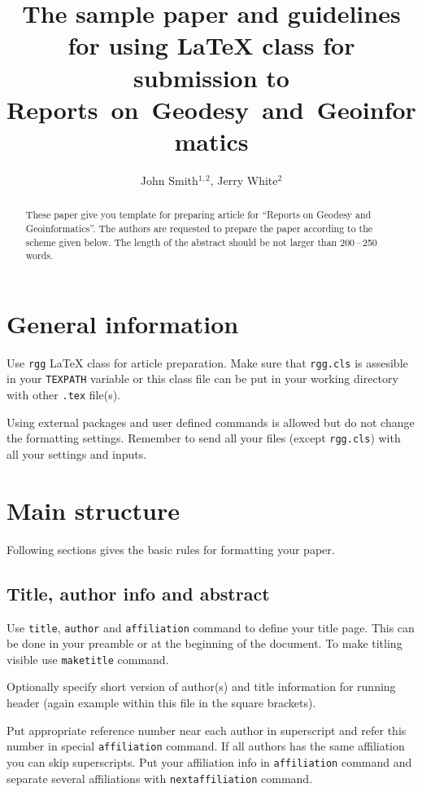\documentclass{rgg}
\title[The sample paper\ldots]{%
  The sample paper and guidelines for using \LaTeX{} class for submission to 
  Reports~on~Geodesy~and~Geoinformatics}
\author[Smith, J., White, J.]{John Smith$^{1,2}$, Jerry White$^2$}
\affiliation{%
  $^1$Department of Very Important Issues,\\
  Faculty of Even More Important Issues,\\
  Awesome University
  \nextaffiliation
  $^2$Department of Geodesy Affairs,\\
  Institute of Geodesy and Geoinformatics
}
\begin{document}
    \maketitle

    \begin{abstract}
      These paper give you template for preparing article for ``Reports on 
      Geodesy and Geoinformatics''. The authors are requested to prepare the 
      paper according to the scheme given below. The length of the abstract 
      should be not larger than 200\,–\,250 words.
    \end{abstract}

  \section{General information}
    Use \texttt{rgg} \LaTeX{} class for article preparation.
    Make sure that \texttt{rgg.cls} is assesible in your
    \texttt{TEXPATH} variable or this class file can be put
    in your working directory with other \texttt{.tex} file(s).

    Using external packages and user defined commands is allowed
    but do not change the formatting settings.
    Remember to send all your files (except \texttt{rgg.cls}) 
    with all your settings and inputs.

  \section{Main structure}
    \label{labelforsection}

    Following sections gives the basic rules for formatting your
    paper.

  \subsection{Title, author info and abstract}
    Use \texttt{title}, \texttt{author} 
    and \texttt{affiliation} command
    to define your title page. This can be done
    in your preamble or at the beginning of the document.
    To make titling visible use \texttt{maketitle} command.

    Optionally specify short version of author(s) and title information
    for running header (again example within this file in the square brackets).

    Put appropriate reference number near each author in superscript
    and refer this number in special \texttt{affiliation} command.
    If all authors has the same affiliation you can skip superscripts.
    Put your affiliation info in \texttt{affiliation} command
    and separate several affiliations with \texttt{nextaffiliation} command.
\end{document}
